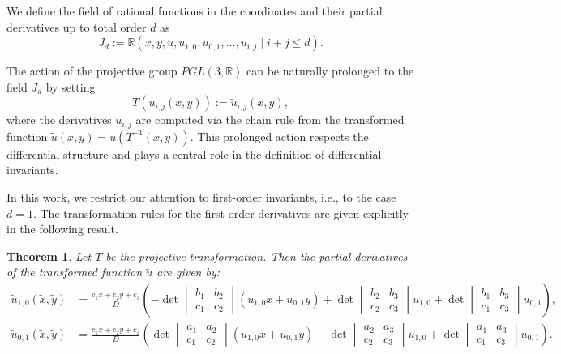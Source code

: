 \documentclass[12pt,reqno]{amsart}
\newtheorem{theorem}{Theorem}
\begin{document}
We define the field of rational functions in the coordinates and their partial derivatives up to total order $d$ as
\[
J_d := \mathbb{R}(x, y, u, u_{1,0}, u_{0,1}, \dots, u_{i,j} \mid i + j \le d).
\]

The action of the projective group $PGL(3, \mathbb{R})$ can be naturally prolonged to the  field $J_d$ by setting
\[
T  (u_{i,j}(x,y)) :=  \tilde u_{i,j}(x,y),
\]
where the derivatives $\tilde u_{i,j}$ are computed via the chain rule from the transformed function $\tilde u(x,y) = u(T^{-1}(x,y))$. This prolonged action respects the differential structure and plays a central role in the definition of differential invariants.

In this work, we restrict our attention to first-order invariants, i.e., to the case $d=1$. The transformation rules for the first-order derivatives are given explicitly in the following result.

\begin{theorem}\label{thm:first-prol}
Let $T$ be the projective transformation. Then the partial derivatives of the transformed function $\tilde u$ are given by:
\begin{align*}
\tilde u_{1,0}(\tilde x, \tilde y) &=
\frac{c_1 x + c_2 y + c_3}{D} \left(
  -\det\begin{vmatrix} b_1 & b_2 \\ c_1 & c_2 \end{vmatrix} (u_{1,0} x + u_{0,1} y)
  +\det\begin{vmatrix} b_2 & b_3 \\ c_2 & c_3 \end{vmatrix} u_{1,0}
  +\det\begin{vmatrix} b_1 & b_3 \\ c_1 & c_3 \end{vmatrix} u_{0,1}
\right), %
\\[4pt]
\tilde u_{0,1}(\tilde x, \tilde y) &=
\frac{c_1 x + c_2 y + c_3}{D} \left(
  \det\begin{vmatrix} a_1 & a_2 \\ c_1 & c_2 \end{vmatrix} (u_{1,0} x + u_{0,1} y)
  -\det\begin{vmatrix} a_2 & a_3 \\ c_2 & c_3 \end{vmatrix} u_{1,0}
  +\det\begin{vmatrix} a_1 & a_3 \\ c_1 & c_3 \end{vmatrix} u_{0,1}
\right).%
\end{align*}
\end{theorem}
\end{document}

